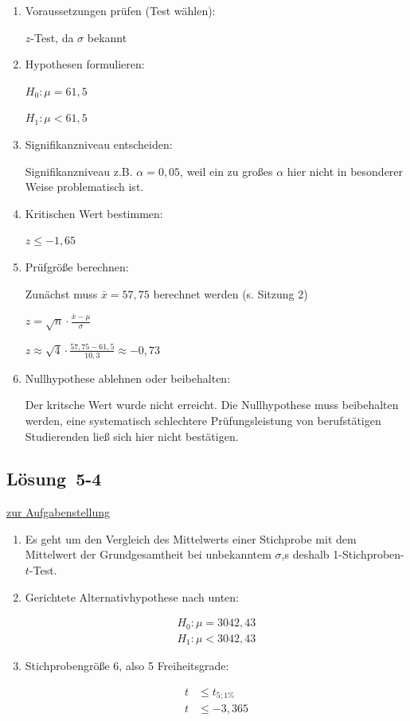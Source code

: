 \documentclass[
  11pt,
  ngerman,
  a4paper,
]{report}
\begin{document}
\begin{enumerate}
\def\labelenumi{\arabic{enumi}.}
\item
  Voraussetzungen prüfen (Test wählen):

  \(z\)-Test, da \(\sigma\) bekannt
\item
  Hypothesen formulieren:

  \(H_0 : \mu = 61{,}5\)

  \(H_1 : \mu < 61{,}5\)
\item
  Signifikanzniveau entscheiden:

  Signifikanzniveau z.B. \(\alpha=0,05\), weil ein zu großes \(\alpha\) hier nicht in besonderer Weise problematisch ist.
\item
  Kritischen Wert bestimmen:

  \(z \leq -1{,}65\)
\item
  Prüfgröße berechnen:

  Zunächst muss \(\bar{x} = 57{,}75\) berechnet werden (s. Sitzung 2)

  \(z=\sqrt{n}\cdot\frac{\bar{x}-\mu}{\sigma}\)

  \(z\approx\sqrt{4}\cdot\frac{57{,}75-61{,}5}{10{,}3}\approx-0{,}73\)
\item
  Nullhypothese ablehnen oder beibehalten:

  Der kritsche Wert wurde nicht erreicht. Die Nullhypothese muss beibehalten werden, eine systematisch schlechtere Prüfungsleistung von berufstätigen Studierenden ließ sich hier nicht bestätigen.
\end{enumerate}

\hypertarget{loesung-5-4}{%
\subsection{Lösung~5-4}\label{loesung-5-4}}

\protect\hyperlink{aufgabe-5-4}{zur Aufgabenstellung}

\begin{enumerate}
\def\labelenumi{\alph{enumi})}
\item
  Es geht um den Vergleich des Mittelwerts einer Stichprobe mit dem Mittelwert der Grundgesamtheit bei unbekanntem \(\sigma\),s deshalb 1-Stichproben-\(t\)-Test.
\item
  Gerichtete Alternativhypothese nach unten:

  \[\begin{aligned}
   H_0: \mu=3042,43\\
   H_1: \mu < 3042,43
   \end{aligned}\]
\item
  Stichprobengröße 6, also 5 Freiheitsgrade:

  \[\begin{aligned}
   t &\leq t_{5;1\%}\\
   t &\leq -3,365
   \end{aligned}\]
\end{enumerate}
\end{document}
